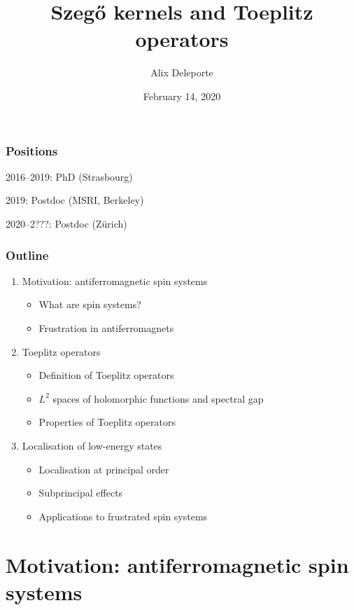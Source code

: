 \documentclass[mathserif]{beamer}
\title{Szeg\H{o} kernels and Toeplitz operators}
\author{Alix Deleporte}
\date{February 14, 2020}
\institute[UZH]{Institut für Mathematik\\Universität Zürich}
\begin{document}
\beamertemplatenavigationsymbolsempty

    \expandafter\def\expandafter\insertshorttitle\expandafter{%
       \insertshorttitle\hfill%
       }%


\begin{frame}
	\titlepage
      \end{frame}

      \begin{frame}
  \frametitle{Positions}
  2016--2019: PhD (Strasbourg)

  \vfill

  2019: Postdoc (MSRI, Berkeley)

  \vfill

  2020--2???: Postdoc (Zürich)
\end{frame}

      \begin{frame}
        \frametitle{Outline}
        \begin{enumerate}
        \item Motivation: antiferromagnetic spin systems
          \begin{itemize}
          \item What are spin systems?
          \item Frustration in antiferromagnets
          \end{itemize}
        \item Toeplitz operators
          \begin{itemize}
            \item Definition of Toeplitz operators
            \item $L^2$ spaces of holomorphic functions and spectral
              gap
            \item Properties of Toeplitz operators
          \end{itemize}
        \item Localisation of low-energy states
          \begin{itemize}
          \item Localisation at principal order
          \item Subprincipal effects
          \item Applications to frustrated spin systems
          \end{itemize}
        \end{enumerate}
      \end{frame}

      \section{Motivation: antiferromagnetic spin systems}
\end{document}
